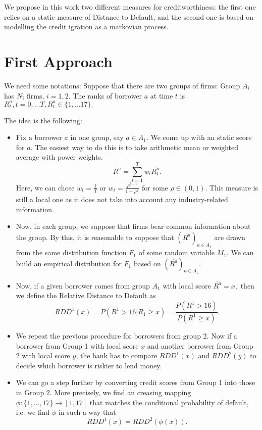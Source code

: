 \documentclass[runningheads,a4paper]{llncs}
\begin{document}
We propose in this work two different measures for creditworthiness: the first one relies on a static measure of Distance to Default, and the second one is based on modelling the credit igration as a markovian process. 


\section{First Approach}

We need some notations: Suppose that there are two groups of firms: Group $A_i$ has $N_i$ firms, $i=1, 2.$ The ranks of borrower $a$ at time $t$ is $R^a_t, t=0,\dots T, R^a_t\in\{1,\dots 17\}.$

The idea is the following:
\begin{itemize}
    \item Fix a borrower $a$ in one group, say $a\in A_1.$ We come up with an static  score for $a.$ The easiest way to do this is to take arithmetic mean or weighted average with power weights.
    $$\overline{R^a}=\sum_{t=1}^Tw_tR_t^a.$$
    Here,  we can chose $w_t=\frac{1}{T}$ or $w_t=\frac{\rho^{t-1}}{1-\rho^T}$ for some $\rho \in (0, 1).$ This measure is still a local one as it does not take into account any industry-related information.
    \item Now, in each group, we suppose that firms bear common information about the group. By this, it is reasonable to suppose that $(\overline{R^a})_{a\in A_1}$ are drawn from the same distribution function $F_1$ of some random variable $M_1.$ We can build an empirical distribution for $F_1$ based on $(\overline{R^a})_{a\in A_1}$.
    \item Now, if a given borrower comes from group $A_1$ with local score $\overline{R^a}=x,$ then we define the Relative Distance to Default  as
    $$RDD^1(x)=P(R^1>16|R_1\ge x)=\frac{P(R^1>16)}{P(R^1\ge x)}.$$
    \item We repeat the previous procedure for borrowers from group 2. Now if a borrower from Group 1 with local score $x$ and another borrower from Group 2 with local score $y$, the bank has to compare $RDD^1(x)$ and $RDD^2(y)$ to decide which borrower is riskier to lend money.
    
    \item We can go a step further by converting credit scores from Group 1 into those in Group 2. More precisely, we find an creasing  mapping $\phi: \{1,\dots,17\}\to [1, 17]$ that matches the conditional probability of default, i.e. we find $\phi$ in such a way that
    $$RDD^1(x)=RDD^2(\phi(x)).$$
    
\end{itemize}
\end{document}
